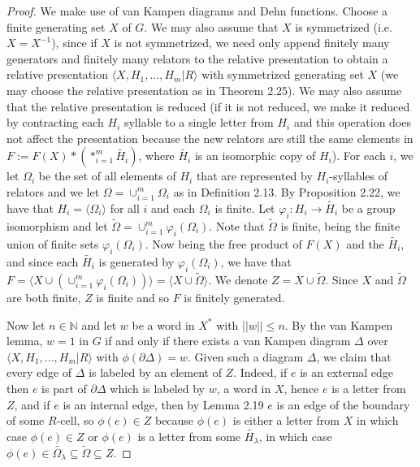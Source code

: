 \documentclass[12pt]{article}
\newcommand{\vs}{\vskip10pt}
\begin{document}
	\begin{proof}
		
		We make use of van Kampen diagrams and Dehn functions. Choose a finite generating set $X$ of $G$. We may also assume that $X$ is symmetrized (i.e. $X = X^{-1}$), since if $X$ is not symmetrized, we need only append finitely many generators and finitely many relators to the relative presentation to obtain a relative presentation $\langle X, H_1,...,H_m \vert R \rangle$ with symmetrized generating set $X$ (we may choose the relative presentation as in Theorem 2.25). We may also assume that the relative presentation is reduced (if it is not reduced, we make it reduced by contracting each $H_i$ syllable to a single letter from $H_i$ and this operation does not affect the presentation because the new relators are still the same elements in $F := F(X) * (*_{i=1}^m \tilde{H_i})$, where $\tilde{H_i}$ is an isomorphic copy of $H_i$). For each $i$, we let $\Omega_i$ be the set of all elements of $H_i$ that are represented by $H_i$-syllables of relators and we let $\Omega = \cup_{i=1}^m \Omega_i$ as in Definition 2.13. By Proposition 2.22, we have that $H_i = \langle \Omega_i \rangle$ for all $i$ and each $\Omega_i$ is finite. Let $\varphi_i : H_i \rightarrow \tilde{H_i}$ be a group isomorphism and let $\tilde{\Omega} = \cup_{i=1}^m \varphi_i(\Omega_i)$. Note that $\tilde{\Omega}$ is finite, being the finite union of finite sets $\varphi_i(\Omega_i)$. Now being the free product of $F(X)$ and the $\tilde{H_i}$, and since each $\tilde{H_i}$ is generated by $\varphi_i(\Omega_i)$, we have that $F = \langle X \cup (\cup_{i=1}^m \varphi_i(\Omega_i)) \rangle = \langle X \cup \tilde{\Omega} \rangle$. We denote $Z = X \cup \tilde{\Omega}$. Since $X$ and $\tilde{\Omega}$ are both finite, $Z$ is finite and so $F$ is finitely generated. 
		
		\vs 
		
		Now let $n \in \mathbb{N}$ and let $w$ be a word in $X^*$ with $\vert \vert w \vert \vert \leq n$. By the van Kampen lemma, $w = 1$ in $G$ if and only if there exists a van Kampen diagram $\Delta$ over $\langle X, H_1,...,H_m \vert R \rangle$ with $\phi(\partial \Delta) = w$. Given such a diagram $\Delta$, we claim that every edge of $\Delta$ is labeled by an element of $Z$. Indeed, if $e$ is an external edge then $e$ is part of $\partial \Delta$ which is labeled by $w$, a word in $X$, hence $e$ is a letter from $Z$, and if $e$ is an internal edge, then by Lemma 2.19 $e$ is an edge of the boundary of some $R$-cell, so $\phi(e) \in Z$ because $\phi(e)$ is either a letter from $X$ in which case $\phi(e) \in Z$ or $\phi(e)$ is a letter from some $\tilde{H_\lambda}$, in which case $\phi(e) \in \tilde{\Omega_\lambda} \subseteq \tilde{\Omega} \subseteq Z$. 
		

\end{proof}
\end{document}
